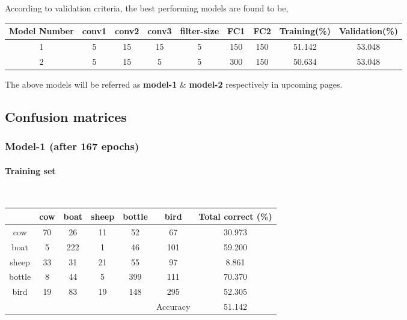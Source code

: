 \documentclass[fleqn]{article}
\newcommand{\myparagraph}[1]{\paragraph{#1}\mbox{}\\}
\begin{document}
According to validation criteria, the best performing models are found to be,\\

\begin{center}
  \begin{longtable}{c | c | c | c | c | c | c | c | c}
    \multicolumn{1}{c}{Model Number} &
  	\multicolumn{1}{c}{conv1} &
	\multicolumn{1}{c}{conv2} & 
	\multicolumn{1}{c}{conv3} & 
	\multicolumn{1}{c}{filter-size } & 
	\multicolumn{1}{c}{FC1} &
	\multicolumn{1}{c}{FC2} & 
	\multicolumn{1}{c}{Training(\%)} &
	\multicolumn{1}{c}{Validation(\%)}\\
	\hline
    1  &  5       &  15    &  15     & 5    &  150    &  150 		& 51.142 & 53.048\\\hline 
    2  &  5      &   15     &  5    &  5    &  300    & 150 		& 50.634 & 53.048\\\hline
	
  \end{longtable}
\end{center}

The above models will be referred as \textbf{model-1} \& \textbf{model-2} respectively in upcoming pages.

\subsection{Confusion matrices}

\subsubsection{Model-1 (after 167 epochs)}
\myparagraph{Training set}
\begin{center}
  \begin{longtable}{ c | c | c | c | c | c | c}
  	\multicolumn{1}{c}{} &
	\multicolumn{1}{c}{cow} & 
	\multicolumn{1}{c}{boat } & 
	\multicolumn{1}{c}{sheep } &
	\multicolumn{1}{c}{bottle } & 
	\multicolumn{1}{c}{bird } &
	\multicolumn{1}{c}{Total correct (\%) }\\
    \hline
    cow       &  70    &  26     & 11    &  52    &  67         & 30.973\\\hline 
    boat      &  5     & 222     &  1    &  46    & 101         & 59.200\\\hline
    sheep     &  33    &  31     & 21    &  55    &  97         & 8.861\\\hline
    bottle    &   8    &  44     &  5    & 399    & 111         & 70.370\\\hline
    bird      &  19    &  83     & 19    & 148    & 295         & 52.305\\\hline
              &      &         &        &        &   Accuracy 	& 51.142\\\hline
  \end{longtable}
\end{center}
\end{document}
